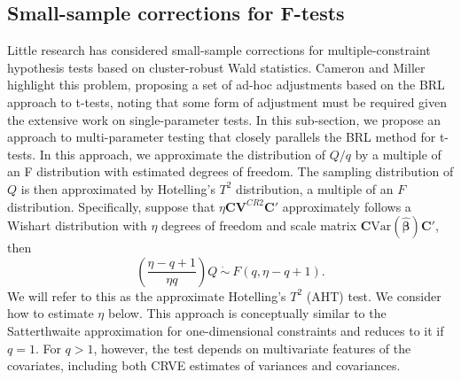 \documentclass[12pt]{article}\usepackage[]{graphicx}\usepackage[]{color}
\newcommand{\Var}{\text{Var}}
\newcommand{\bm}{\mathbf}
\newcommand{\bs}{\boldsymbol}
\begin{document}

\subsection{Small-sample corrections for F-tests}

Little research has considered small-sample corrections for multiple-constraint hypothesis tests based on cluster-robust Wald statistics.
Cameron and Miller highlight this problem, proposing a set of ad-hoc adjustments based on the BRL approach to t-tests, noting that some form of adjustment must be required given the extensive work on single-parameter tests.
In this sub-section, we propose an approach to multi-parameter testing that closely parallels the BRL method for t-tests.
In this approach, we approximate the distribution of $Q / q$ by a multiple of an F distribution with estimated degrees of freedom. 
The sampling distribution of $Q$ is then approximated by Hotelling's $T^2$ distribution, a multiple of an $F$ distribution. 
Specifically, suppose that $\eta \bm{C}\bm{V}^{CR2} \bm{C}'$ approximately follows a Wishart distribution with $\eta$ degrees of freedom and scale matrix $\bm{C} \Var\left(\bs{\hat\beta}\right)\bm{C}'$, then 
\begin{equation}
\label{eq:AHT}
\left(\frac{\eta - q + 1}{\eta q}\right) Q \ \dot\sim \ F(q, \eta - q + 1).
\end{equation}
We will refer to this as the approximate Hotelling's $T^2$ (AHT) test.
We consider how to estimate $\eta$ below.
This approach is conceptually similar to the Satterthwaite approximation for one-dimensional constraints and reduces to it if $q = 1$. 
For $q > 1$, however, the test depends on multivariate features of the covariates, including both CRVE estimates of variances and covariances. 
\end{document}
